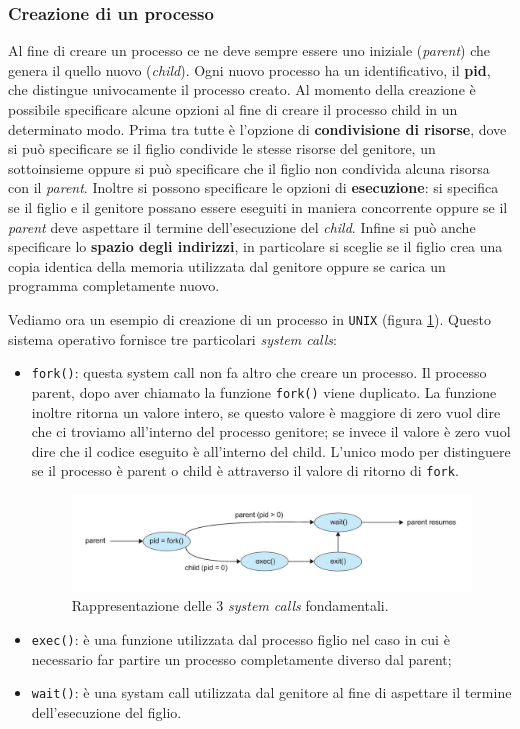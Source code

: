 \subsubsection{Creazione di un processo}\label{creazione di un processo}
Al fine di creare un processo ce ne deve sempre essere uno iniziale (\textit{parent}) che genera il quello nuovo (\textit{child}). Ogni nuovo processo ha un identificativo, il \textbf{pid}, che distingue univocamente il processo creato. Al momento della creazione è possibile specificare alcune opzioni al fine di creare il processo child in un determinato modo. Prima tra tutte è l'opzione di \textbf{condivisione di risorse}, dove si può specificare se il figlio condivide le stesse risorse del genitore, un sottoinsieme oppure si può specificare che il figlio non condivida alcuna risorsa con il \textit{parent}. Inoltre si possono specificare le opzioni di \textbf{esecuzione}: si specifica se il figlio e il genitore possano essere eseguiti in maniera concorrente oppure se il \textit{parent} deve aspettare il termine dell'esecuzione del \textit{child}. Infine si può anche specificare lo \textbf{spazio degli indirizzi}, in particolare si sceglie se il figlio crea una copia identica della memoria utilizzata dal genitore oppure se carica un programma completamente nuovo.

Vediamo ora un esempio di creazione di un processo in \texttt{UNIX} (figura \ref{fig:fork}). Questo sistema operativo fornisce tre particolari \textit{system calls}:

\vspace{-5px}
\begin{itemize}
\setlength{\itemsep}{-.15 em}
    \item \texttt{fork()}: questa system call non fa altro che creare un processo. Il processo parent, dopo aver chiamato la funzione \texttt{fork()} viene duplicato. La funzione inoltre ritorna un valore intero, se questo valore è maggiore di zero vuol dire che ci troviamo all'interno del processo genitore; se invece il valore è zero vuol dire che il codice eseguito è all'interno del child. L'unico modo per distinguere se il processo è parent o child è attraverso il valore di ritorno di \texttt{fork}.
    \begin{figure}[h]
    \centering
    \includegraphics[width = .75\textwidth]{../res/imgs/processes/fork.png}
    \caption{Rappresentazione delle 3 \textit{system calls} fondamentali.}
    \label{fig:fork}
\end{figure}
    \item \texttt{exec()}: è una funzione utilizzata dal processo figlio nel caso in cui è necessario far partire un processo completamente diverso dal parent;
    \item \texttt{wait()}: è una systam call utilizzata dal genitore al fine di aspettare il termine dell'esecuzione del figlio.
\end{itemize}


